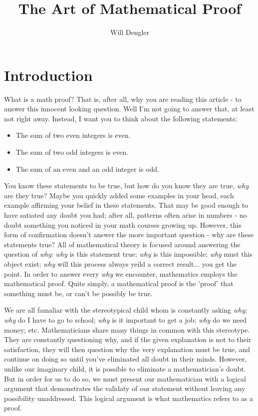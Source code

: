 \documentclass[a4paper,12pt]{article}
\begin{document}
\title{The Art of Mathematical Proof}
\author{Will Dengler}
\maketitle

\section{Introduction}
What is a math proof? That is, after all, why you are reading this article - to answer this innocent looking question. Well I'm not going to answer that, at least not right away. Instead, I want you to think about the following statements:
\begin{itemize}
	\item The sum of two even integers is even.
	\item The sum of two odd integers is even.
	\item The sum of an even and an odd integer is odd.
\end{itemize}

You know these statements to be true, but how do you know they are true, \textit{why} are they true? Maybe you quickly added some examples in your head, each example affirming your belief in these statements. That may be good enough to have satiated any doubt you had; after all, patterns often arise in numbers - no doubt something you noticed in your math courses growing up. However, this form of confirmation doesn't answer the more important question - why are these statements true? All of mathematical theory is focused around answering the question of \textit{why}: \textit{why} is this statement true; \textit{why} is this impossible; \textit{why} must this object exist; \textit{why} will this process always yeild a correct result... you get the point. In order to answer every \textit{why} we encounter, mathematics employs the mathematical proof. Quite simply, a mathematical proof is the 'proof' that something must be, or can't be possibly be true. 

We are all famaliar with the stereotypical child whom is constantly asking \textit{why}: \textit{why} do I have to go to school; \textit{why} is it important to get a job; \textit{why} do we need money; etc. Mathematicians share many things in common with this stereotype. They are constantly questioning why, and if the given explanation is not to their satisfaction, they will then question why the very explanation must be true, and continue on doing so until you've eliminated all doubt in their minds. However, unlike our imaginary child, it is possible to eliminate a mathematician's doubt. But in order for us to do so, we must present our mathematician with a logical argument that demonstrates the validaty of our statement without leaving any possibility unaddressed. This logical argument is what mathematics refers to as a proof.  
  
\end{document}
